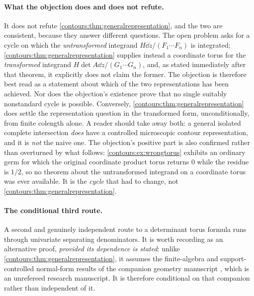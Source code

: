 \documentclass[11pt,letterpaper]{article}
\theoremstyle{definition}
\theoremstyle{remark}
\numberwithin{equation}{section}
\begin{document}
\paragraph{What the objection does and does not refute.} It does not refute
\cref{contours:thm:generalrepresentation}, and the two are consistent, because they
answer different questions. The open problem asks for a cycle on which the
\emph{untransformed} integrand $H\dd z/(F_1\cdots F_n)$ is integrated;
\cref{contours:thm:generalrepresentation} supplies instead a coordinate torus for
the \emph{transformed} integrand $H\det A\dd z/(G_1\cdots G_n)$, and, as stated
immediately after that theorem, it explicitly does not claim the former. The
objection is therefore best read as a statement about which of the two
representations has been achieved. Nor does the objection's existence prove that no
single suitably nonstandard cycle is possible. Conversely,
\cref{contours:thm:generalrepresentation} does settle the representation question in
the transformed form, unconditionally, from finite colength alone. A reader should
take away both: a general isolated complete intersection \emph{does} have a
controlled microscopic contour representation, and it is \emph{not} the naive one.
The objection's positive part is also confirmed rather than overturned by what
follows: \cref{contours:ex:wrongtorus} exhibits an ordinary germ for which the
original coordinate product torus returns $0$ while the residue is $1/2$, so no
theorem about the untransformed integrand on a coordinate torus was ever
available. It is the \emph{cycle} that had to change, not
\cref{contours:thm:generalrepresentation}.

\paragraph{The conditional third route.} A second and genuinely independent route to
a determinant torus formula runs through univariate separating denominators. It is
worth recording as an alternative proof, \emph{provided its dependence is stated}:
unlike \cref{contours:thm:generalrepresentation}, it assumes the finite-algebra and
support-controlled normal-form results of the companion geometry manuscript
\cite{Geometry}, which is an unrefereed research manuscript. It is therefore
conditional on that companion rather than independent of it.
\end{document}
